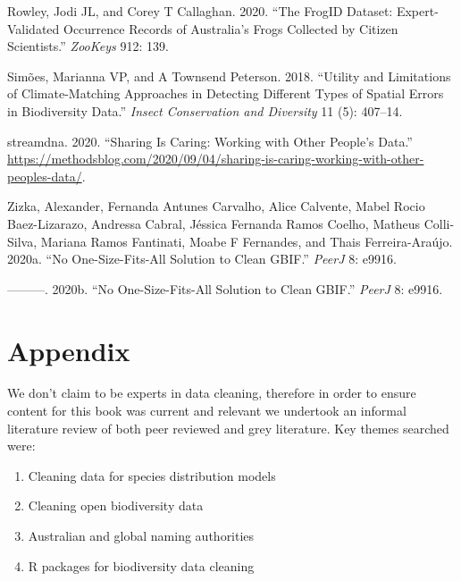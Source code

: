 \documentclass[
  letterpaper,
  DIV=11,
  numbers=noendperiod,
  oneside]{scrreprt}
\newlength{\cslhangindent}
\newlength{\cslentryspacingunit} %
\newenvironment{CSLReferences}[2] %
 {%
  \setlength{\parindent}{0pt}
  \ifodd #1
  \let\oldpar\par
  \def\par{\hangindent=\cslhangindent\oldpar}
  \fi
  \setlength{\parskip}{#2\cslentryspacingunit}
 }%
 {}
\begin{document}
\begin{CSLReferences}{1}{0}
\leavevmode{}%
Rowley, Jodi JL, and Corey T Callaghan. 2020. {``The FrogID Dataset:
Expert-Validated Occurrence Records of Australia's Frogs Collected by
Citizen Scientists.''} \emph{ZooKeys} 912: 139.

\leavevmode{}%
Simões, Marianna VP, and A Townsend Peterson. 2018. {``Utility and
Limitations of Climate-Matching Approaches in Detecting Different Types
of Spatial Errors in Biodiversity Data.''} \emph{Insect Conservation and
Diversity} 11 (5): 407--14.

\leavevmode{}%
streamdna. 2020. {``Sharing Is {Caring}: {Working} with {Other} People's
{Data}.''}
\url{https://methodsblog.com/2020/09/04/sharing-is-caring-working-with-other-peoples-data/}.

\leavevmode{}%
Zizka, Alexander, Fernanda Antunes Carvalho, Alice Calvente, Mabel Rocio
Baez-Lizarazo, Andressa Cabral, Jéssica Fernanda Ramos Coelho, Matheus
Colli-Silva, Mariana Ramos Fantinati, Moabe F Fernandes, and Thais
Ferreira-Araújo. 2020a. {``No One-Size-Fits-All Solution to Clean
{GBIF}.''} \emph{PeerJ} 8: e9916.

\leavevmode{}%
---------. 2020b. {``No One-Size-Fits-All Solution to Clean GBIF.''}
\emph{PeerJ} 8: e9916.

\end{CSLReferences}


\hypertarget{sec-appendix}{%
\chapter{Appendix}\label{sec-appendix}}

We don't claim to be experts in data cleaning, therefore in order to
ensure content for this book was current and relevant we undertook an
informal literature review of both peer reviewed and grey literature.
Key themes searched were:

\begin{enumerate}
\def\labelenumi{\arabic{enumi}.}
\item
  Cleaning data for species distribution models
\item
  Cleaning open biodiversity data
\item
  Australian and global naming authorities
\item
  R packages for biodiversity data cleaning
\end{enumerate}
\end{document}
